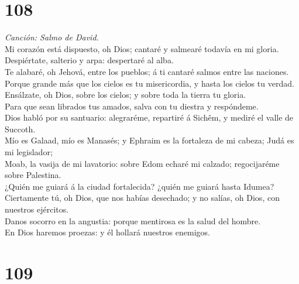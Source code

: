 \hypertarget{section-107}{%
\section{108}\label{section-107}}

 \emph{Canción: Salmo de David.}\\
Mi corazón está dispuesto, oh Dios; cantaré y salmearé todavía en mi
gloria.\\
 Despiértate, salterio y arpa: despertaré al alba.\\
 Te alabaré, oh Jehová, entre los pueblos; á ti cantaré
salmos entre las naciones.\\
 Porque grande más que los cielos es tu misericordia, y
hasta los cielos tu verdad.\\
 Ensálzate, oh Dios, sobre los cielos; y sobre toda la
tierra tu gloria.\\
 Para que sean librados tus amados, salva con tu diestra y
respóndeme.\\
 Dios habló por su santuario: alegraréme, repartiré á
Sichêm, y mediré el valle de Succoth.\\
 Mío es Galaad, mío es Manasés; y Ephraim es la fortaleza de
mi cabeza; Judá es mi legislador;\\
 Moab, la vasija de mi lavatorio: sobre Edom echaré mi
calzado; regocijaréme sobre Palestina.\\
 ¿Quién me guiará á la ciudad fortalecida? ¿quién me guiará
hasta Idumea?\\
 Ciertamente tú, oh Dios, que nos habías desechado; y no
salías, oh Dios, con nuestros ejércitos.\\
 Danos socorro en la angustia: porque mentirosa es la salud
del hombre.\\
 En Dios haremos proezas: y él hollará nuestros enemigos.

\hypertarget{section-108}{%
\section{109}\label{section-108}}

